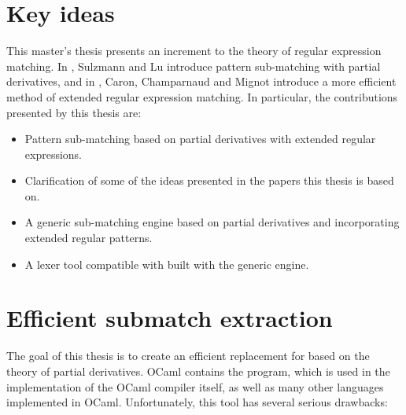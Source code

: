 \section{Key ideas}

This master's thesis presents an increment to the theory of regular expression
matching. In \cite{pdpat}, Sulzmann and Lu introduce pattern sub-matching with
partial derivatives, and in \cite{pdere}, Caron, Champarnaud and Mignot
introduce a more efficient method of extended regular expression matching. In
particular, the contributions presented by this thesis are:

\begin{itemize}

   \item Pattern sub-matching based on partial derivatives with extended regular
      expressions.

   \item Clarification of some of the ideas presented in the papers this thesis
      is based on.

   \item A generic sub-matching engine based on partial derivatives and
      incorporating extended regular patterns.

   \item A lexer tool compatible with \ocamllex{} built with the generic engine.

\end{itemize}


\section{Efficient submatch extraction}

The goal of this thesis is to create an efficient replacement for \ocamllex{}
based on the theory of partial derivatives. OCaml contains the \ocamllex{}
program, which is used in the implementation of the OCaml compiler itself, as
well as many other languages implemented in OCaml.  Unfortunately, this tool has
several serious drawbacks:

